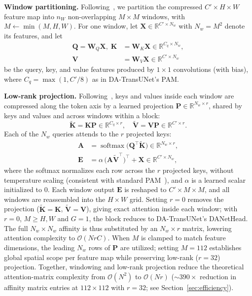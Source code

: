 \textbf{Window partitioning.} Following~\cite{liu2021swin}, we partition the compressed $C'{\times}H{\times}W$ feature map into $n_W$ non-overlapping $M{\times}M$ windows, with $M \leftarrow \min(M, H, W)$. For one window, let $\mathbf{X} \in \mathbb{R}^{C' \times N_w}$ with $N_w = M^2$ denote its features, and let
\begin{equation}
\begin{aligned}
  \mathbf{Q} = \mathbf{W}_Q\mathbf{X},\; \mathbf{K} &= \mathbf{W}_K\mathbf{X} \in \mathbb{R}^{C_q \times N_w}, \\
  \mathbf{V} &= \mathbf{W}_V\mathbf{X} \in \mathbb{R}^{C' \times N_w}
\end{aligned}
  \label{eq:qkv}
\end{equation}
be the query, key, and value features produced by $1{\times}1$ convolutions (with bias), where $C_q = \max(1, C'/8)$ as in DA-TransUNet's PAM.

\textbf{Low-rank projection.} Following~\cite{wang2020linformer}, keys and values inside each window are compressed along the token axis by a learned projection $\mathbf{P} \in \mathbb{R}^{N_w \times r}$, shared by keys and values and across windows within a block:
\begin{equation}
  \tilde{\mathbf{K}} = \mathbf{K}\mathbf{P} \in \mathbb{R}^{C_q \times r}, \quad \tilde{\mathbf{V}} = \mathbf{V}\mathbf{P} \in \mathbb{R}^{C' \times r}.
  \label{eq:lowrank}
\end{equation}
Each of the $N_w$ queries attends to the $r$ projected keys:
\begin{equation}
\begin{aligned}
  \mathbf{A} &= \operatorname{softmax}\!\big(\mathbf{Q}^{\top}\tilde{\mathbf{K}}\big) \in \mathbb{R}^{N_w \times r}, \\
  \mathbf{E} &= \alpha\,\big(\mathbf{A}\tilde{\mathbf{V}}^{\top}\big)^{\!\top} + \mathbf{X} \in \mathbb{R}^{C' \times N_w},
\end{aligned}
  \label{eq:pam_lr}
\end{equation}
where the softmax normalizes each row across the $r$ projected keys, without temperature scaling (consistent with standard PAM~\cite{fu2019dual}), and $\alpha$ is a learned scalar initialized to 0. Each window output $\mathbf{E}$ is reshaped to $C'{\times}M{\times}M$, and all windows are reassembled into the $H{\times}W$ grid. Setting $r{=}0$ removes the projection ($\tilde{\mathbf{K}}{=}\mathbf{K}$, $\tilde{\mathbf{V}}{=}\mathbf{V}$), giving exact attention inside each window; with $r{=}0$, $M \geq H, W$ and $G{=}1$, the block reduces to DA-TransUNet's DANetHead. The full $N_w{\times}N_w$ affinity is thus substituted by an $N_w{\times}r$ matrix, lowering attention complexity to $\mathcal{O}(NrC)$. When $M$ is clamped to match feature dimensions, the leading $N_w$ rows of $\mathbf{P}$ are utilized; setting $M{=}112$ establishes global spatial scope per feature map while preserving low-rank ($r{=}32$) projection. Together, windowing and low-rank projection reduce the theoretical attention-matrix complexity from $\mathcal{O}(N^2)$ to $\mathcal{O}(Nr)$ (${\sim}390{\times}$ reduction in affinity matrix entries at $112{\times}112$ with $r{=}32$; see Section~\ref{sec:efficiency}).


